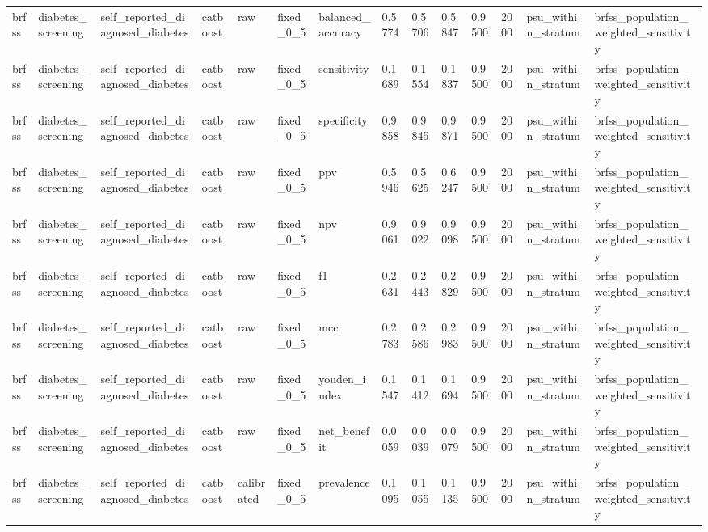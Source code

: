 \begin{tabular}{llllllllllllll}
brfss & diabetes\_screening & self\_reported\_diagnosed\_diabetes & catboost & raw & fixed\_0\_5 & balanced\_accuracy & 0.5774 & 0.5706 & 0.5847 & 0.9500 & 2000 & psu\_within\_stratum & brfss\_population\_weighted\_sensitivity \\
brfss & diabetes\_screening & self\_reported\_diagnosed\_diabetes & catboost & raw & fixed\_0\_5 & sensitivity & 0.1689 & 0.1554 & 0.1837 & 0.9500 & 2000 & psu\_within\_stratum & brfss\_population\_weighted\_sensitivity \\
brfss & diabetes\_screening & self\_reported\_diagnosed\_diabetes & catboost & raw & fixed\_0\_5 & specificity & 0.9858 & 0.9845 & 0.9871 & 0.9500 & 2000 & psu\_within\_stratum & brfss\_population\_weighted\_sensitivity \\
brfss & diabetes\_screening & self\_reported\_diagnosed\_diabetes & catboost & raw & fixed\_0\_5 & ppv & 0.5946 & 0.5625 & 0.6247 & 0.9500 & 2000 & psu\_within\_stratum & brfss\_population\_weighted\_sensitivity \\
brfss & diabetes\_screening & self\_reported\_diagnosed\_diabetes & catboost & raw & fixed\_0\_5 & npv & 0.9061 & 0.9022 & 0.9098 & 0.9500 & 2000 & psu\_within\_stratum & brfss\_population\_weighted\_sensitivity \\
brfss & diabetes\_screening & self\_reported\_diagnosed\_diabetes & catboost & raw & fixed\_0\_5 & f1 & 0.2631 & 0.2443 & 0.2829 & 0.9500 & 2000 & psu\_within\_stratum & brfss\_population\_weighted\_sensitivity \\
brfss & diabetes\_screening & self\_reported\_diagnosed\_diabetes & catboost & raw & fixed\_0\_5 & mcc & 0.2783 & 0.2586 & 0.2983 & 0.9500 & 2000 & psu\_within\_stratum & brfss\_population\_weighted\_sensitivity \\
brfss & diabetes\_screening & self\_reported\_diagnosed\_diabetes & catboost & raw & fixed\_0\_5 & youden\_index & 0.1547 & 0.1412 & 0.1694 & 0.9500 & 2000 & psu\_within\_stratum & brfss\_population\_weighted\_sensitivity \\
brfss & diabetes\_screening & self\_reported\_diagnosed\_diabetes & catboost & raw & fixed\_0\_5 & net\_benefit & 0.0059 & 0.0039 & 0.0079 & 0.9500 & 2000 & psu\_within\_stratum & brfss\_population\_weighted\_sensitivity \\
brfss & diabetes\_screening & self\_reported\_diagnosed\_diabetes & catboost & calibrated & fixed\_0\_5 & prevalence & 0.1095 & 0.1055 & 0.1135 & 0.9500 & 2000 & psu\_within\_stratum & brfss\_population\_weighted\_sensitivity \\

\end{tabular}
